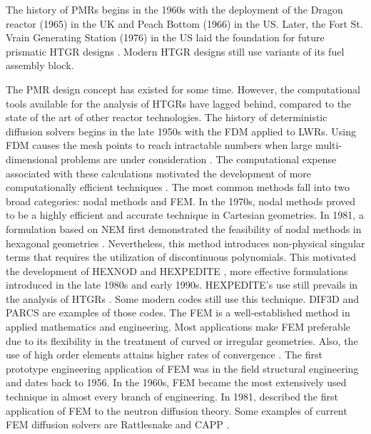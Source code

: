 \documentclass[11pt,letterpaper]{article}
\begin{document}
The history of \glspl{PMR} begins in the 1960s with the deployment of the Dragon reactor (1965) in the \gls{UK} and Peach Bottom (1966) in the \gls{US}.
Later, the Fort St. Vrain Generating Station (1976) in the \gls{US} laid the foundation for future prismatic \gls{HTGR} designs \cite{aris_iaea_general_2013}.
Modern \gls{HTGR} designs still use variants of its fuel assembly block.

The \gls{PMR} design concept has existed for some time.
However, the computational tools available for the analysis of \glspl{HTGR} have lagged behind, compared to the state of the art of other reactor technologies.
The history of deterministic diffusion solvers begins in the late 1950s with the \gls{FDM} applied to \glspl{LWR}.
Using \gls{FDM} causes the mesh points to reach intractable numbers when large multi-dimensional problems are under consideration \cite{lewis_finite_1986}.
The computational expense associated with these calculations motivated the development of more computationally efficient techniques \cite{lawrence_progress_1985}.
The most common methods fall into two broad categories: nodal methods and \gls{FEM}.
In the 1970s, nodal methods proved to be a highly efficient and accurate technique in Cartesian geometries.
In 1981, a formulation based on \gls{NEM} first demonstrated the feasibility of nodal methods in hexagonal geometries \cite{duracz_nodal_1981}.
Nevertheless, this method introduces non-physical singular terms that requires the utilization of discontinuous polynomials.
This motivated the development of HEXNOD \cite{wagner_three-dimensional_1989} and HEXPEDITE \cite{fitzpatrick_hexpedite_1992}, more effective formulations introduced in the late 1980s and early 1990s.
HEXPEDITE's use still prevails in the analysis of \glspl{HTGR} \cite{ortensi_deterministic_2010-1}.
Some modern codes still use this technique.
DIF3D \cite{lawrence_dif3d_1983} and PARCS \cite{downar_parcs_2004} are examples of those codes.
The \gls{FEM} is a well-established method in applied mathematics and engineering.
Most applications make \gls{FEM} preferable due to its flexibility in the treatment of curved or irregular geometries.
Also, the use of high order elements attains higher rates of convergence \cite{cavdar_finite_2004}.
The first prototype engineering application of \gls{FEM} was in the field structural engineering and dates back to 1956.
In the 1960s, \gls{FEM} became the most extensively used technique in almost every branch of engineering.
In 1981, \cite{lewis_finite_1981} described the first application of \gls{FEM} to the neutron diffusion theory.
Some examples of current \gls{FEM} diffusion solvers are Rattlesnake \cite{wang_rattlesnake_2019} and CAPP \cite{lee_development_2011}.
\end{document}
